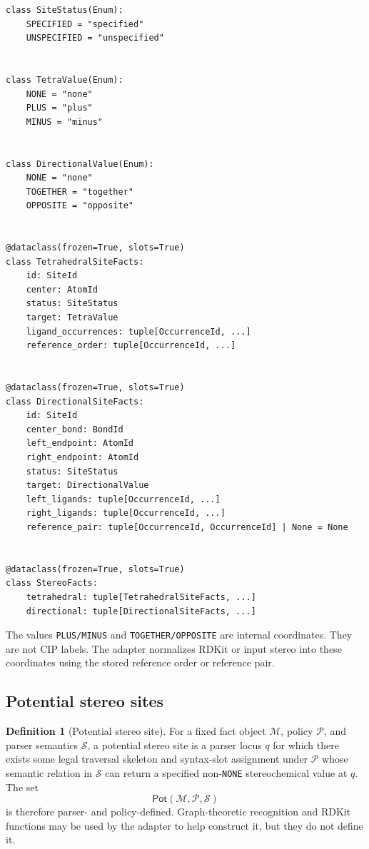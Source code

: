 \documentclass[10pt,a4paper]{article}
\newcommand{\calM}{\mathcal M}
\newcommand{\calP}{\mathcal P}
\newcommand{\calS}{\mathcal S}
\newcommand{\Pot}{\mathsf{Pot}}
\theoremstyle{definition}
\newtheorem{definition}[lemma]{Definition}
\theoremstyle{remark}
\begin{document}
\begin{lstlisting}
class SiteStatus(Enum):
    SPECIFIED = "specified"
    UNSPECIFIED = "unspecified"


class TetraValue(Enum):
    NONE = "none"
    PLUS = "plus"
    MINUS = "minus"


class DirectionalValue(Enum):
    NONE = "none"
    TOGETHER = "together"
    OPPOSITE = "opposite"


@dataclass(frozen=True, slots=True)
class TetrahedralSiteFacts:
    id: SiteId
    center: AtomId
    status: SiteStatus
    target: TetraValue
    ligand_occurrences: tuple[OccurrenceId, ...]
    reference_order: tuple[OccurrenceId, ...]


@dataclass(frozen=True, slots=True)
class DirectionalSiteFacts:
    id: SiteId
    center_bond: BondId
    left_endpoint: AtomId
    right_endpoint: AtomId
    status: SiteStatus
    target: DirectionalValue
    left_ligands: tuple[OccurrenceId, ...]
    right_ligands: tuple[OccurrenceId, ...]
    reference_pair: tuple[OccurrenceId, OccurrenceId] | None = None


@dataclass(frozen=True, slots=True)
class StereoFacts:
    tetrahedral: tuple[TetrahedralSiteFacts, ...]
    directional: tuple[DirectionalSiteFacts, ...]
\end{lstlisting}

The values \texttt{PLUS/MINUS} and \texttt{TOGETHER/OPPOSITE} are internal
coordinates.  They are not CIP labels.  The adapter normalizes RDKit or input
stereo into these coordinates using the stored reference order or reference
pair.

\subsection{Potential stereo sites}

\begin{definition}[Potential stereo site]
For a fixed fact object \(\calM\), policy \(\calP\), and parser semantics
\(\calS\), a potential stereo site is a parser locus \(q\) for which there exists
some legal traversal skeleton and syntax-slot assignment under \(\calP\) whose
semantic relation in \(\calS\) can return a specified non-\texttt{NONE}
stereochemical value at \(q\).  The set
\[
   \Pot(\calM,\calP,\calS)
\]
is therefore parser- and policy-defined.  Graph-theoretic recognition and RDKit
functions may be used by the adapter to help construct it, but they do not define
it.
\end{definition}
\end{document}
